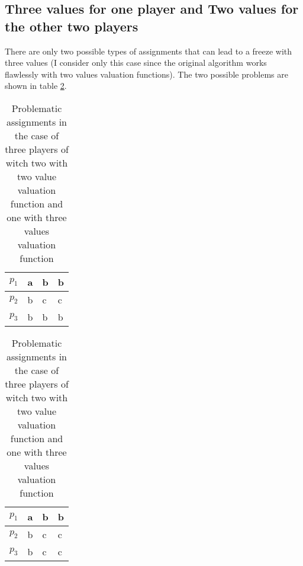 \documentclass{article}
\begin{document}
\subsection{Three values for one player and Two values for the other two players}
There are only two possible types of assignments that can lead to a freeze with three values (I consider only this case since the original algorithm works flawlessly with two values valuation functions). The two possible problems are shown in table \ref{table:three-players-two-two-values-one-three-problematic-assignments}.
\begin{table}[h]
\parbox{.45\linewidth}{
\centering
    \begin{tabular}{|l|l|l|l|}
    \hline
    $p_1$ & a & b & b \\ \hline
    $p_2$ & b & c & c \\ \hline
    $p_3$ & b & b & b \\ \hline
    \end{tabular}
}
\hfill
\parbox{.45\linewidth}{
\centering
    \begin{tabular}{|l|l|l|l|}
    \hline
    $p_1$ & a & b & b \\ \hline
    $p_2$ & b & c & c \\ \hline
    $p_3$ & b & c & c \\ \hline
    \end{tabular}
}
\caption{Problematic assignments in the case of three players of witch two with two value valuation function and one with three values valuation function}
\label{table:three-players-two-two-values-one-three-problematic-assignments}
\end{table}
\end{document}
